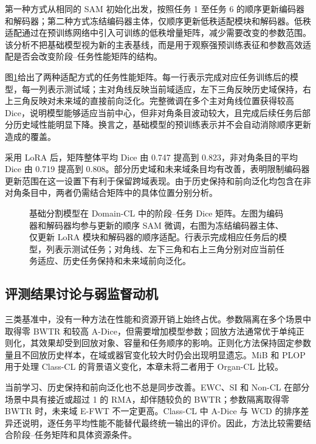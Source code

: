 第一种方式从相同的 SAM 初始化出发，按照任务 1 至任务 6 的顺序更新编码器和解码器；第二种方式冻结编码器主体，仅顺序更新低秩适配模块和解码器。低秩适配通过在预训练网络中引入可训练的低秩增量矩阵，减少需要改变的参数范围\cite{hu2022lora,ding2023peft}。该分析不把基础模型视为新的主表基线，而是用于观察强预训练表征和参数高效适配是否会改变阶段--任务性能矩阵的结构。

图\ref{fig:benchmark-sam-lora}给出了两种适配方式的任务性能矩阵。每一行表示完成对应任务训练后的模型，每一列表示测试域；主对角线反映当前域适应，左下三角反映历史域保持，右上三角反映对未来域的直接前向泛化。完整微调在多个主对角线位置获得较高 Dice，说明模型能够适应当前中心，但非对角条目波动较大，且完成后续任务后部分历史域性能明显下降。换言之，基础模型的预训练表示并不会自动消除顺序更新造成的覆盖。

采用 LoRA 后，矩阵整体平均 Dice 由 0.747 提高到 0.823，非对角条目的平均 Dice 由 0.719 提高到 0.808。部分历史域和未来域条目均有改善，表明限制编码器更新范围在这一设置下有利于保留跨域表现。由于历史保持和前向泛化均包含在非对角条目中，两者仍需结合矩阵中的具体位置分别分析。

\begin{figure}[htbp]
\centering
{}
\caption[基础分割模型在 Domain-CL 中的阶段--任务 Dice 矩阵]{基础分割模型在 Domain-CL 中的阶段--任务 Dice 矩阵。左图为编码器和解码器均参与更新的顺序 SAM 微调，右图为冻结编码器主体、仅更新 LoRA 模块和解码器的顺序适配。行表示完成相应任务后的模型，列表示测试任务；对角线、左下三角和右上三角分别对应当前任务适应、历史任务保持和未来域前向泛化。}
\label{fig:benchmark-sam-lora}
\end{figure}

\subsection{评测结果讨论与弱监督动机}
\label{sec:benchmark-findings-limitations}

三类基准中，没有一种方法在性能和资源开销上始终占优。参数隔离在多个场景中取得零 BWTR 和较高 A-Dice，但需要增加模型参数；回放方法通常优于单纯正则化，其效果却受到回放对象、容量和任务顺序的影响。正则化方法保持固定参数量且不回放历史样本，在域或器官变化较大时仍会出现明显遗忘。MiB 和 PLOP 用于处理 Class-CL 的背景语义变化，本章未将二者用于 Organ-CL 比较。

当前学习、历史保持和前向泛化也不总是同步改善。EWC、SI 和 Non-CL 在部分场景中具有接近或超过 1 的 RMA，却伴随较负的 BWTR；参数隔离取得零 BWTR 时，未来域 E-FWT 不一定更高。Class-CL 中 A-Dice 与 WCD 的排序差异还说明，逐任务平均性能不能替代最终统一输出的评价。因此，方法比较需要结合阶段--任务矩阵和具体资源条件。

